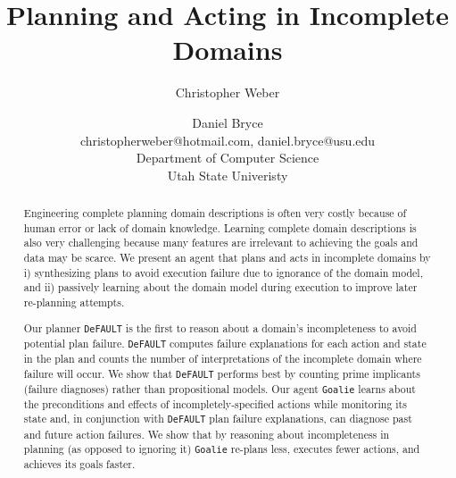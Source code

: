 \documentclass[letterpaper]{article}
\def\default{{\tt DeFAULT}}
\def\goalie{{\tt Goalie}}
\begin{document}
\title{Planning and Acting in Incomplete Domains}

\author{
Christopher Weber \and Daniel Bryce\\
christopherweber@hotmail.com, daniel.bryce@usu.edu\\
Department of Computer Science\\
Utah State Univeristy
}

\maketitle

\begin{abstract}
Engineering complete planning domain descriptions is often very costly because
of human error or lack of domain knowledge. Learning complete domain
descriptions is also very challenging because many features are irrelevant to
achieving the goals and data may be scarce.  We present an agent that plans and
acts in incomplete domains by i) synthesizing plans to avoid execution failure
due to ignorance of the domain model, and ii) passively learning about the
domain model during execution to improve later re-planning attempts.

Our planner \default{} is the first to reason about a domain's incompleteness to
avoid potential plan failure.  \default{} computes failure explanations for each
action and state in the plan and counts the number of interpretations of the
incomplete domain where failure will occur. We show that \default{} performs
best by counting  prime implicants (failure diagnoses) rather than propositional
models. Our agent \goalie{} learns about the preconditions and effects of
incompletely-specified actions while monitoring its state and, in conjunction
with \default{} plan failure explanations, can diagnose past and future action
failures.   We show that by reasoning about incompleteness in planning (as
opposed to ignoring it) \goalie{} re-plans less, executes fewer actions, and
achieves its goals faster.

\end{abstract}
\end{document}
